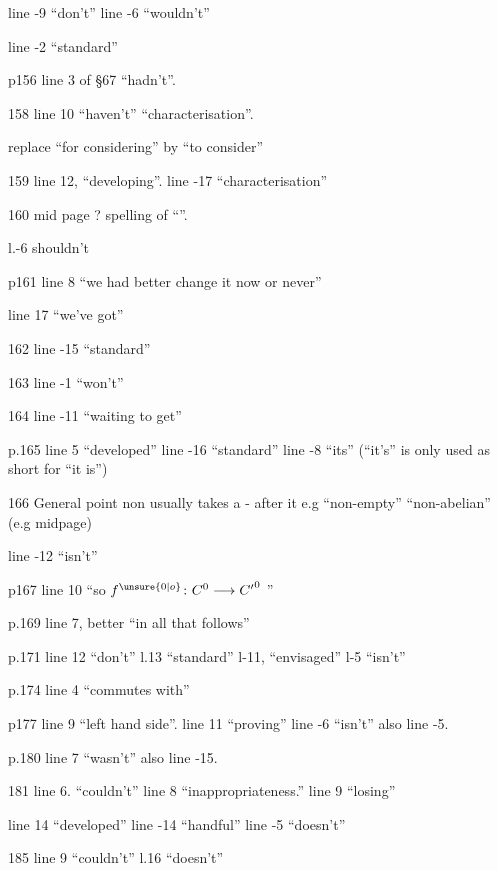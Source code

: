 line -9 ``don't'' line -6 ``wouldn't'' 

line -2 ``standard''


p156 line 3 of \S67 ``hadn't''.

158 line 10 ``haven't'' ``characterisation''.

replace ``for considering'' by ``to consider''

159 line 12, ``developing''. line -17 ``characterisation''

160 mid page ? spelling of ``''.

l.-6 shouldn't

p161 line 8  ``we had better change it now or never''

line 17 ``we've got''

162 line -15 ``standard'' 

163 line -1 ``won't''

164 line -11 ``waiting to get''

p.165 line 5 ``developed'' line -16 ``standard'' line -8 ``its'' (``it's'' is only used as short for ``it is'')

166 General point non usually takes a - after it e.g ``non-empty'' ``non-abelian'' (e.g midpage)

line -12 ``isn't''

p167 line 10 ``so  $f^{\unsure{0|o}}\colon C^0\longrightarrow {C'}^0$ ''

p.169 line 7, better ``in all that follows'' 

p.171 line 12 ``don't'' l.13 ``standard'' l-11, ``envisaged'' l-5 ``isn't''

p.174 line 4 ``commutes with''

p177 line 9 ``left hand side''. line 11 ``proving'' line -6 ``isn't'' also line -5.

p.180 line 7 ``wasn't'' also line -15.

181 line 6. ``couldn't'' line 8 ``inappropriateness.'' line 9 ``losing''

line 14 ``developed'' line -14 ``handful'' line -5 ``doesn't''

185 line 9 ``couldn't'' l.16 ``doesn't''

